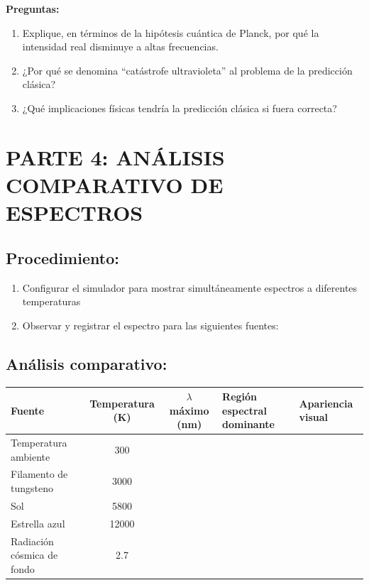 \documentclass[12pt,a4paper]{article}
\begin{document}
	\begin{preguntabox}
		\textbf{Preguntas:}
		\begin{enumerate}
			\item Explique, en términos de la hipótesis cuántica de Planck, por qué la intensidad real disminuye a altas frecuencias.
			\item ¿Por qué se denomina ``catástrofe ultravioleta'' al problema de la predicción clásica?
			\item ¿Qué implicaciones físicas tendría la predicción clásica si fuera correcta?
		\end{enumerate}
	\end{preguntabox}
	
	\section{PARTE 4: ANÁLISIS COMPARATIVO DE ESPECTROS}
	
	\subsection{Procedimiento:}
	\begin{enumerate}
		\item Configurar el simulador para mostrar simultáneamente espectros a diferentes temperaturas
		\item Observar y registrar el espectro para las siguientes fuentes:
	\end{enumerate}
	
	\subsection{Análisis comparativo:}
	
	\begin{center}
		\begin{tabular}{|p{3cm}|c|c|p{3.5cm}|p{2.5cm}|}
			\hline
			\textbf{Fuente} & \textbf{Temperatura (K)} & \textbf{$\lambda$ máximo (nm)} & \textbf{Región espectral dominante} & \textbf{Apariencia visual} \\
			\hline
			Temperatura ambiente & 300 & & & \\
			\hline
			Filamento de tungsteno & 3000 & & & \\
			\hline
			Sol & 5800 & & & \\
			\hline
			Estrella azul & 12000 & & & \\
			\hline
			Radiación cósmica de fondo & 2.7 & & & \\
			\hline
		\end{tabular}
	\end{center}
	
\end{document}
